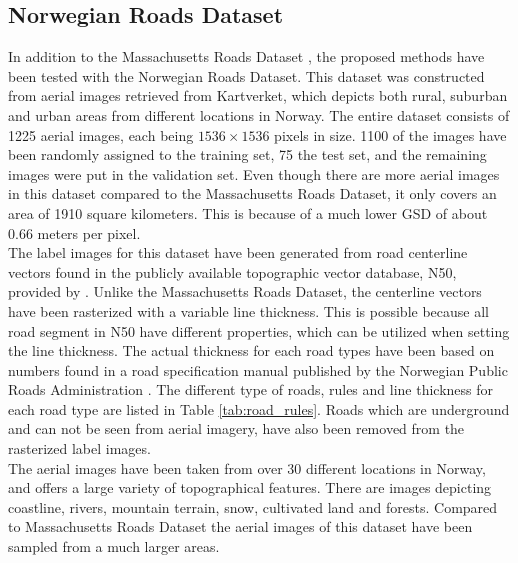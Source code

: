 
\subsection{Norwegian Roads Dataset}
In addition to the Massachusetts Roads Dataset \citep{MnihThesis}, the proposed methods have been tested with the Norwegian Roads Dataset. This dataset was constructed from aerial images retrieved from Kartverket, which depicts both rural, suburban and urban areas from different locations in Norway. The entire dataset consists of 1225 aerial images, each being $1536\times 1536$ pixels in size. 1100 of the images have been randomly assigned to the training set, 75 the test set, and the remaining images were put in the validation set. Even though there are more aerial images in this dataset compared to the Massachusetts Roads Dataset, it only covers an area of 1910 square kilometers. This is because of a much lower \ac{GSD} of about 0.66 meters per pixel. \\


The label images for this dataset have been generated from road centerline vectors found in the publicly available topographic vector database, N50, provided by \cite{Kartverket}. Unlike the Massachusetts Roads Dataset, the centerline vectors have been rasterized with a variable line thickness. This is possible because all road segment in N50 have different properties, which can be utilized when setting the line thickness. The actual thickness for each road types have been based on numbers found in a road specification manual published by the Norwegian Public Roads Administration \citep{Norwegian_road_manual}. The different type of roads, rules and line thickness for each road type are listed in Table \ref{tab:road_rules}. Roads which are underground and can not be seen from aerial imagery, have also been removed from the rasterized label images. \\

The aerial images have been taken from over 30 different locations in Norway, and offers a large variety of topographical features. There are images depicting coastline, rivers, mountain terrain, snow, cultivated land and forests. Compared to Massachusetts Roads Dataset the aerial images of this dataset have been sampled from a much larger areas. \\


